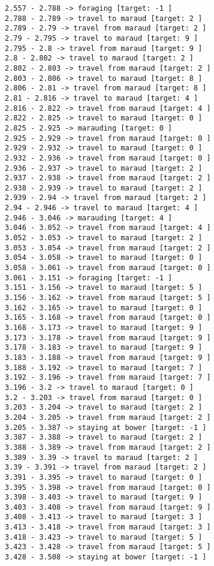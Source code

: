 \documentclass[11pt]{article}
\begin{document}
\begin{Verbatim}[commandchars=\\\{\}]
2.557 - 2.788 -> foraging [target: -1 ]
2.788 - 2.789 -> travel to maraud [target: 2 ]
2.789 - 2.79 -> travel from maraud [target: 2 ]
2.79 - 2.795 -> travel to maraud [target: 9 ]
2.795 - 2.8 -> travel from maraud [target: 9 ]
2.8 - 2.802 -> travel to maraud [target: 2 ]
2.802 - 2.803 -> travel from maraud [target: 2 ]
2.803 - 2.806 -> travel to maraud [target: 8 ]
2.806 - 2.81 -> travel from maraud [target: 8 ]
2.81 - 2.816 -> travel to maraud [target: 4 ]
2.816 - 2.822 -> travel from maraud [target: 4 ]
2.822 - 2.825 -> travel to maraud [target: 0 ]
2.825 - 2.925 -> marauding [target: 0 ]
2.925 - 2.929 -> travel from maraud [target: 0 ]
2.929 - 2.932 -> travel to maraud [target: 0 ]
2.932 - 2.936 -> travel from maraud [target: 0 ]
2.936 - 2.937 -> travel to maraud [target: 2 ]
2.937 - 2.938 -> travel from maraud [target: 2 ]
2.938 - 2.939 -> travel to maraud [target: 2 ]
2.939 - 2.94 -> travel from maraud [target: 2 ]
2.94 - 2.946 -> travel to maraud [target: 4 ]
2.946 - 3.046 -> marauding [target: 4 ]
3.046 - 3.052 -> travel from maraud [target: 4 ]
3.052 - 3.053 -> travel to maraud [target: 2 ]
3.053 - 3.054 -> travel from maraud [target: 2 ]
3.054 - 3.058 -> travel to maraud [target: 0 ]
3.058 - 3.061 -> travel from maraud [target: 0 ]
3.061 - 3.151 -> foraging [target: -1 ]
3.151 - 3.156 -> travel to maraud [target: 5 ]
3.156 - 3.162 -> travel from maraud [target: 5 ]
3.162 - 3.165 -> travel to maraud [target: 0 ]
3.165 - 3.168 -> travel from maraud [target: 0 ]
3.168 - 3.173 -> travel to maraud [target: 9 ]
3.173 - 3.178 -> travel from maraud [target: 9 ]
3.178 - 3.183 -> travel to maraud [target: 9 ]
3.183 - 3.188 -> travel from maraud [target: 9 ]
3.188 - 3.192 -> travel to maraud [target: 7 ]
3.192 - 3.196 -> travel from maraud [target: 7 ]
3.196 - 3.2 -> travel to maraud [target: 0 ]
3.2 - 3.203 -> travel from maraud [target: 0 ]
3.203 - 3.204 -> travel to maraud [target: 2 ]
3.204 - 3.205 -> travel from maraud [target: 2 ]
3.205 - 3.387 -> staying at bower [target: -1 ]
3.387 - 3.388 -> travel to maraud [target: 2 ]
3.388 - 3.389 -> travel from maraud [target: 2 ]
3.389 - 3.39 -> travel to maraud [target: 2 ]
3.39 - 3.391 -> travel from maraud [target: 2 ]
3.391 - 3.395 -> travel to maraud [target: 0 ]
3.395 - 3.398 -> travel from maraud [target: 0 ]
3.398 - 3.403 -> travel to maraud [target: 9 ]
3.403 - 3.408 -> travel from maraud [target: 9 ]
3.408 - 3.413 -> travel to maraud [target: 3 ]
3.413 - 3.418 -> travel from maraud [target: 3 ]
3.418 - 3.423 -> travel to maraud [target: 5 ]
3.423 - 3.428 -> travel from maraud [target: 5 ]
3.428 - 3.508 -> staying at bower [target: -1 ]

\end{Verbatim}
\end{document}

